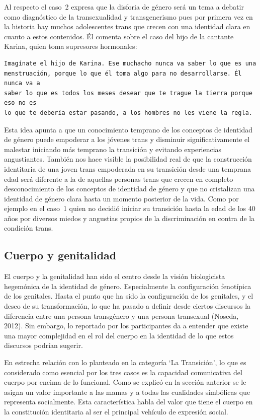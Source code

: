 Al respecto el caso~2 expresa que la disforia de género será un tema a debatir
como diagnóstico de la transexualidad y transgenerismo pues por primera vez en
la historia hay muchos adolescentes trans que crecen con una identidad clara en
cuanto a estos contenidos. Él comenta sobre el caso del hijo de la cantante
Karina, quien toma supresores hormonales:

\begin{verbatim}
Imagínate el hijo de Karina. Ese muchacho nunca va saber lo que es una
menstruación, porque lo que él toma algo para no desarrollarse. Él nunca va a
saber lo que es todos los meses desear que te trague la tierra porque eso no es
lo que te debería estar pasando, a los hombres no les viene la regla.
\end{verbatim}

Esta idea apunta a que un conocimiento temprano de los conceptos de identidad de
género puede empoderar a los jóvenes trans y disminuir significativamente el
malestar iniciando más temprano la transición y evitando experiencias
angustiantes. También nos hace visible la posibilidad real de que la
construcción identitaria de una joven trans empoderada en su transición desde
una temprana edad será diferente a la de aquellas personas trans que crecen en
completo desconocimiento de los conceptos de identidad de género y que no
cristalizan una identidad de género clara hasta un momento posterior de la vida.
Como por ejemplo en el caso~1 quien no decidió iniciar su transición hasta la
edad de los 40 años por diversos miedos y angustias propios de la discriminación
en contra de la condición trans.

\subsection{Cuerpo y genitalidad}

El cuerpo y la genitalidad han sido el centro desde la visión biologicista
hegemónica de la identidad de género. Especialmente la configuración fenotípica
de los genitales. Hasta el punto que ha sido la configuración de los genitales,
y el deseo de su transformación, lo que ha pasado a definir desde ciertos
discursos la diferencia entre una persona transgénero y una persona transexual
(Noseda, 2012). Sin embargo, lo reportado por los participantes da a entender
que existe una mayor complejidad en el rol del cuerpo en la identidad de lo que
estos discursos podrían sugerir.

En estrecha relación con lo planteado en la categoría ‘La Transición’, lo que es
considerado como esencial por los tres casos es la capacidad comunicativa del
cuerpo por encima de lo funcional. Como se explicó en la sección anterior se le
asigna un valor importante a las mamas y a todas las cualidades simbólicas que
representa socialmente. Esta característica habla del valor que tiene el cuerpo
en la constitución identitaria al ser el principal vehículo de expresión social.

